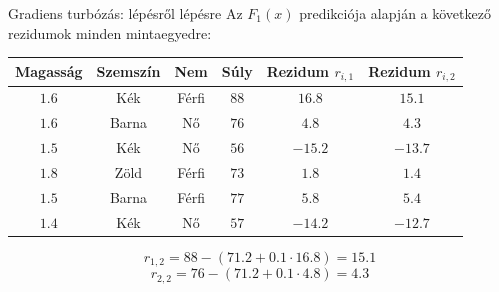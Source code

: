 \documentclass[english, aspectratio=169]{beamer}
\begin{document}
\begin{frame}{Gradiens turbózás: lépésről lépésre}
Az $F_1\left( x \right)$ predikciója alapján a következő rezidumok minden mintaegyedre:
\begin{center}
\begin{small}
\begin{tabular}{|c|c|c|c|c|c|}
\hline
Magasság & Szemszín & Nem & Súly & Rezidum $r_{i,1}$ & Rezidum $r_{i,2}$\\ \hline
$1.6$      & Kék      & Férfi & $88$  & $16.8$  & $15.1$  \\ \hline
$1.6$      & Barna    & Nő    & $76$  & $4.8$   & $4.3$   \\ \hline
$1.5$      & Kék      & Nő    & $56$  & $-15.2$ & $-13.7$ \\ \hline
$1.8$      & Zöld     & Férfi & $73$  & $1.8$   & $1.4$   \\ \hline
$1.5$      & Barna    & Férfi & $77$  & $5.8$   & $5.4$   \\ \hline
$1.4$      & Kék      & Nő    & $57$  & $-14.2$ & $-12.7$ \\ \hline
\end{tabular}
\end{small}
\[
r_{1,2} = 88 - \left(71.2 + 0.1 \cdot 16.8 \right) = 15.1
\]
\[
r_{2,2} = 76 - \left(71.2 + 0.1 \cdot 4.8 \right) = 4.3
\]
\end{center}
\end{frame}
\end{document}
